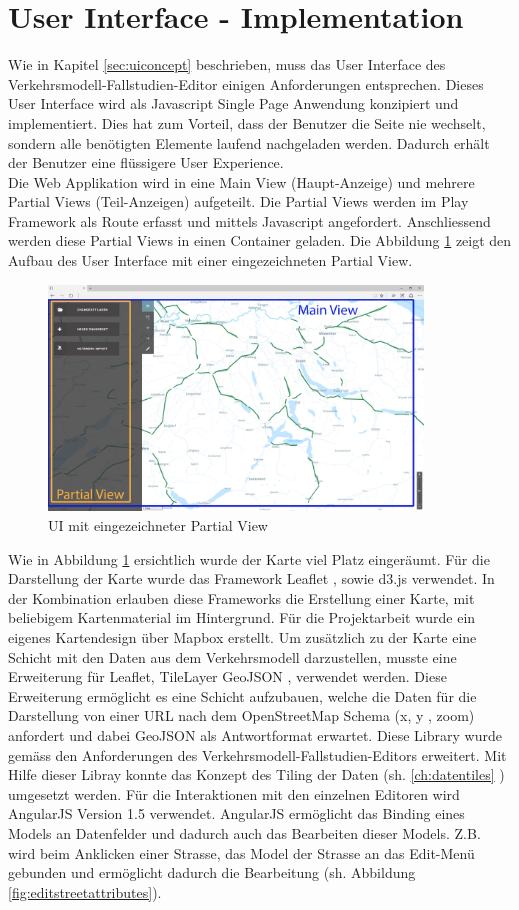 \section{User Interface - Implementation}
Wie in Kapitel \ref{sec:uiconcept} beschrieben, muss das User Interface des Verkehrsmodell-Fallstudien-Editor einigen Anforderungen entsprechen. Dieses User Interface wird als Javascript Single Page Anwendung konzipiert und implementiert. Dies hat zum Vorteil, dass der Benutzer die Seite nie wechselt, sondern alle benötigten Elemente laufend nachgeladen werden. Dadurch erhält der Benutzer eine flüssigere User Experience.\\
Die Web Applikation wird in eine Main View (Haupt-Anzeige) und mehrere Partial Views (Teil-Anzeigen) aufgeteilt. Die Partial Views werden im Play Framework als Route erfasst und mittels Javascript angefordert. Anschliessend werden diese Partial Views in einen Container geladen. Die Abbildung \ref{fig:mainviewpartialview} zeigt den Aufbau des User Interface mit einer eingezeichneten Partial View.
\begin{figure}[H]
\centering
\includegraphics[height=6cm]{images/MainviewPartialview.PNG}
\caption{UI mit eingezeichneter Partial View}
\label{fig:mainviewpartialview}
\end{figure}
\noindent
Wie in Abbildung \ref{fig:mainviewpartialview} ersichtlich wurde der Karte viel Platz eingeräumt. Für die Darstellung der Karte wurde das Framework Leaflet \cite{Leaflet}, sowie d3.js \cite{D3JS} verwendet. In der Kombination erlauben diese Frameworks die Erstellung einer Karte, mit beliebigem Kartenmaterial im Hintergrund. Für die Projektarbeit wurde ein eigenes Kartendesign über Mapbox\cite{Mapbox} erstellt. Um zusätzlich zu der Karte eine Schicht mit den Daten aus dem Verkehrsmodell darzustellen, musste eine Erweiterung für Leaflet, TileLayer GeoJSON \cite{LeafletGeoJSON},  verwendet werden. Diese Erweiterung ermöglicht es eine Schicht aufzubauen, welche die Daten für die Darstellung von einer URL nach dem OpenStreetMap Schema (x, y , zoom) anfordert und dabei GeoJSON als Antwortformat erwartet. Diese Library wurde gemäss den Anforderungen des Verkehrsmodell-Fallstudien-Editors erweitert. Mit Hilfe dieser Libray konnte das Konzept des Tiling der Daten (sh. \ref{ch:datentiles} ) umgesetzt werden. Für die Interaktionen mit den einzelnen Editoren wird AngularJS \cite{AngularJS} Version 1.5 verwendet. AngularJS ermöglicht das Binding eines Models an Datenfelder und dadurch auch das Bearbeiten dieser Models. Z.B. wird beim Anklicken einer Strasse, das Model der Strasse an das Edit-Menü gebunden und ermöglicht dadurch die Bearbeitung (sh. Abbildung \ref{fig:editstreetattributes}).
